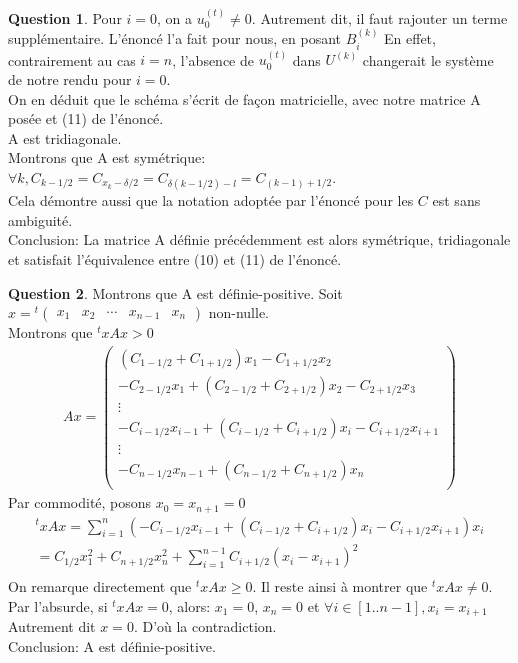 \documentclass[a4paper]{article}
\theoremstyle{definition}
\newtheorem{que}{Question}
\begin{document}
\begin{que}
		Pour $i = 0$, on a $u_0^{(t)} \ne 0$. Autrement dit, il faut rajouter un terme supplémentaire.
		L'énoncé l'a fait pour nous, en posant $B_i^{(k)}$
		En effet, contrairement au cas $i=n$, l'absence de $u_0^{(t)}$ dans $U^{(k)}$ changerait le système de notre rendu pour $i=0$. \\

		On en déduit que le schéma s'écrit de façon matricielle, avec notre matrice A posée et (11) de l'énoncé. \\

		A est tridiagonale. \\

		Montrons que A est symétrique: $\forall k, C_{k-1/2} = C_{x_k - \delta / 2} = C_{\delta (k - 1/2) - l} = C_{(k-1)+1/2}$. \\
		Cela démontre aussi que la notation adoptée par l'énoncé pour les $C$ est sans ambiguité. \\

		Conclusion: La matrice A définie précédemment est alors symétrique, tridiagonale et satisfait l'équivalence entre (10) et (11) de l'énoncé. \\
	\end{que}
	\begin{que}
		Montrons que A est définie-positive.
		Soit $ x = {}^t \begin{pmatrix} x_1 & x_2 & \cdots & x_{n-1} & x_n \end{pmatrix}$ non-nulle. \\
		Montrons que ${}^txAx > 0$
		\begin{align*}
			Ax=
			\begin{pmatrix}
				(C_{1-1/2} + C_{1+1/2}) x_1 - C_{1+1/2} x_2 \\
				 - C_{2-1/2} x_1 + (C_{2-1/2} + C_{2+1/2}) x_2 - C_{2+1/2} x_3 \\
				\vdots \\
				- C_{i-1/2} x_{i-1} + (C_{i-1/2} + C_{i+1/2}) x_i - C_{i+1/2} x_{i+1} \\
				\vdots \\
				- C_{n-1/2} x_{n-1} + (C_{n-1/2} + C_{n+1/2}) x_n \\
			\end{pmatrix}
		\end{align*}
		Par commodité, posons $ x_0 = x_{n+1} = 0$
		\begin{align*}
			{}^txAx=\sum_{i=1}^n (- C_{i-1/2} x_{i-1} + (C_{i-1/2} + C_{i+1/2}) x_i - C_{i+1/2} x_{i+1}) x_i \\
			= C_{1/2} x_1^2 + C_{n+1/2} x_n^2 + \sum_{i=1}^{n-1} C_{i+1/2} (x_i - x_{i+1})^2 \\
		\end{align*}
		On remarque directement que ${}^txAx \ge 0$.
		Il reste ainsi à montrer que ${}^txAx \ne 0$. \\
		Par l'absurde, si ${}^txAx=0$, alors:
		$x_1 = 0$, $x_n = 0$ et $\forall i \in [1..n-1], x_i = x_{i+1}$ \\
		Autrement dit $x = 0$. D'où la contradiction. \\
		Conclusion: A est définie-positive.
	\end{que}
\end{document}
